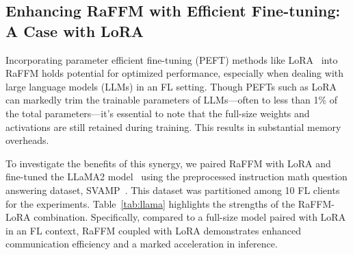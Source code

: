 \subsection{Enhancing RaFFM with Efficient Fine-tuning: A Case with LoRA}
\label{sec:raffm_lora}

Incorporating parameter efficient fine-tuning (PEFT) methods like LoRA~\citep{hu2021lora} into RaFFM holds potential for optimized performance, especially when dealing with large language models (LLMs) in an FL setting. Though PEFTs such as LoRA can markedly trim the trainable parameters of LLMs—often to less than 1\% of the total parameters—it's essential to note that the full-size weights and activations are still retained during training. This results in substantial memory overheads.

To investigate the benefits of this synergy, we paired RaFFM with LoRA and fine-tuned the LLaMA2 model~\citep{touvron2023llama2} using the preprocessed instruction math question answering dataset, SVAMP~\citep{hu2023llmadapter,SVAMP}. This dataset was partitioned among 10 FL clients for the experiments.
Table~\ref{tab:llama} highlights the strengths of the RaFFM-LoRA combination. Specifically, compared to a full-size model paired with LoRA in an FL context, RaFFM coupled with LoRA demonstrates enhanced communication efficiency and a marked acceleration in inference.







% 




